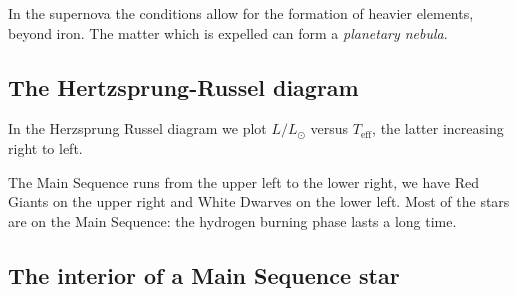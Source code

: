 \documentclass[main.tex]{subfiles}
\begin{document}
In the supernova the conditions allow for the formation of heavier elements, beyond iron.
The matter which is expelled can form a \emph{planetary nebula}.











\subsection{The Hertzsprung-Russel diagram}

In the Herzsprung Russel diagram we plot \(L / L_{\odot}\) versus \(T _{\text{eff}}\), the latter increasing right to left. 

The Main Sequence runs from the upper left to the lower right, we have Red Giants on the upper right and White Dwarves on the lower left. 
Most of the stars are on the Main Sequence: the hydrogen burning phase lasts a long time. 


\subsection{The interior of a Main Sequence star}
\end{document}
